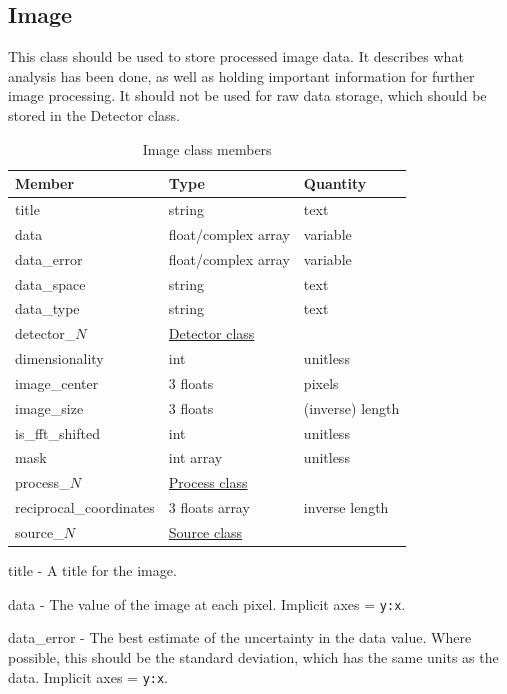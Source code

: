 \documentclass[usletter,11pt]{article}
\newcommand{\member}[2]
{ \noindent
{ \color{softBlue}  #1 - } #2
\vspace{0.2cm}
}
\begin{document}
\subsection{Image}
\label{table:image}

This class should be used to store processed image data. It describes
what analysis has been done, as well as holding important information
for further image processing. It should not be used for raw data
storage, which should be stored in the Detector class.

\begin{table}[h!]\sffamily \footnotesize
\caption{Image class members}

\begin{tabular}{p{4.5cm} p{4.5cm}  p{2.5cm} }

\toprule
\bfseries Member     & \bfseries Type & \bfseries Quantity \\
\midrule
title &  string & text \\
data &  float/complex array & variable \\
data\_error & float/complex array & variable \\
data\_space & string & text \\
data\_type & string & text \\
detector\_$N$ &  \hyperref[table:detector]{Detector class} & \\
dimensionality & int & unitless \\
image\_center & 3 floats & pixels \\
image\_size & 3 floats & (inverse) length \\
is\_fft\_shifted & int & unitless \\ 
mask & int array & unitless \\
process\_$N$ &  \hyperref[table:process]{Process class} & \\
reciprocal\_coordinates & 3 floats array & inverse length  \\
source\_$N$ &  \hyperref[table:source]{Source class} & \\
\bottomrule
\end{tabular}
\end{table}

\member{title}{A title for the image.}

\member{data}{The value of the image at each pixel. Implicit axes = {\tt y:x}.}

\member{data\_error}{The best estimate of the uncertainty in the data
 value. Where possible, this should be the standard deviation, which
 has the same units as the data. Implicit axes = {\tt y:x}.}
\end{document}
